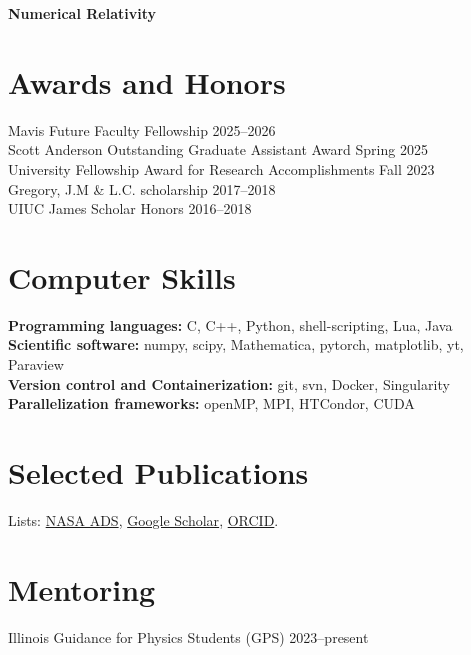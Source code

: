 \documentclass[11pt]{article}
\begin{document}
\textbf{Numerical Relativity}\\

\section*{Awards and Honors}
Mavis Future Faculty Fellowship \hfill 2025--2026\\
Scott Anderson Outstanding Graduate Assistant Award \hfill Spring 2025\\
University Fellowship Award for Research Accomplishments \hfill Fall 2023\\
Gregory, J.M \& L.C. scholarship \hfill 2017--2018\\
UIUC James Scholar Honors \hfill 2016--2018

\ifdefined\withskills{}
\section*{Computer Skills}
\textbf{Programming languages:} C, C++, Python, shell-scripting, Lua, Java\\
\textbf{Scientific software:} numpy, scipy, Mathematica, pytorch, matplotlib, yt, Paraview\\
\textbf{Version control and Containerization: } git, svn, Docker, Singularity\\
\textbf{Parallelization frameworks: }openMP, MPI, HTCondor, CUDA

\else\fi


\section*{Selected Publications}
Lists: \href{\adslibrary}{NASA ADS}, \href{\googlescholar}{Google Scholar}, \href{https://orcid.org/0000-0002-2514-5965}{ORCID}.


\begin{etaremune}[leftmargin=1.25em]

\end{etaremune}


\section*{Mentoring}
Illinois Guidance for Physics Students (GPS) \hfill 2023--present\\
\end{document}
